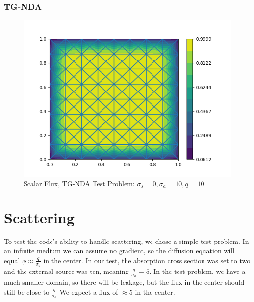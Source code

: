 \subsubsection{TG-NDA}
\begin{figure}[H]
    \centering
    \includegraphics[width=\textwidth]{fig/tgnda_noscat.png}
    \caption{Scalar Flux, TG-NDA Test Problem: $\sigma_s = 0, \sigma_a=10, q=10$}
    \label{fig:tgnda_noscatter}
\end{figure}

\section{Scattering}
To test the code's ability to handle scattering, we chose a simple test problem.  In an infinite medium we can assume no gradient, so the diffusion equation will equal $\phi \approx \frac{q}{\sigma_a}$ in the center. In our test, the absorption cross section was set to two and the external source was ten, meaning $\frac{q}{\sigma_a} = 5$. In the test problem, we have a much smaller domain, so there will be leakage, but the flux in the center should still be close to $\frac{q}{\sigma_a}$ We expect a flux of $\approx 5$ in the center. 
